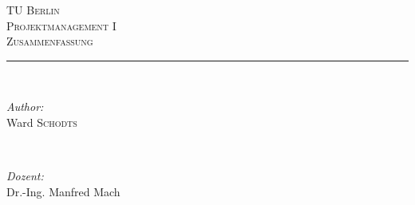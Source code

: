 \documentclass[11pt,a4paper]{article}
\author{Ward Schodts}
\begin{document}
\begin{titlepage}


\newcommand{\HRule}{\rule{\linewidth}{0.5mm}} %

\center %
 

\textsc{\textsc{\LARGE TU Berlin}}\\[1.5cm] %
\textsc{\Large Projektmanagement I}\\[0.5cm] %
\textsc{\large Zusammenfassung}\\[0.5cm] %


\HRule \\[0.4cm]

 

\begin{minipage}{0.4\textwidth}
\begin{flushleft} \large
\emph{Author:}\\
Ward \textsc{Schodts} %
\end{flushleft}
\end{minipage}
~
\begin{minipage}{0.4\textwidth}
\begin{flushright} \large
\emph{Dozent:} \\
Dr.-Ing. Manfred Mach \\ %

\end{flushright}
\end{minipage}\\[4cm]



\end{titlepage}
\end{document}
